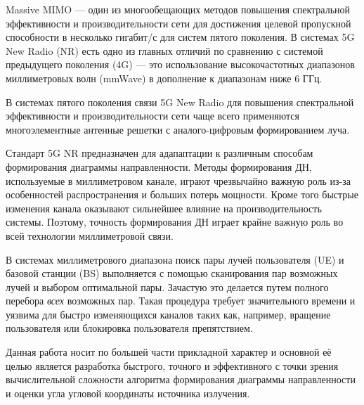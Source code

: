 \Introduction

Massive MIMO — один из многообещающих методов повышения спектральной
эффективности и производительности сети для достижения целевой пропускной
способности в несколько гигабит/с для систем пятого поколения.  В системах 5G
New Radio (NR) есть одно из главных отличий по сравнению с системой предыдущего
поколения (4G) — это использование высокочастотных диапазонов миллиметровых волн
(mmWave) в дополнение к диапазонам ниже 6 ГГц. 

В системах пятого поколения связи 5G New Radio для повышения спектральной
эффективности и производительности  сети чаще всего применяются многоэлементные 
антенные решетки с аналого-цифровым формированием луча.   

Стандарт 5G NR предназначен для адапаптации к различным способам
формирования диаграммы направленности. Методы формирования ДН,
используемые в миллиметровом канале, играют чрезвычайно
важную роль из-за особенностей распространения и больших потерь мощности.
Кроме того быстрые изменения канала оказывают сильнейшее влияние на
производительность системы.  Поэтому, точность формирования ДН
играет крайне важную роль во всей технологии миллиметровой связи. 

В системах миллиметрового диапазона поиск пары лучей пользователя (UE)
и базовой станции (BS) выполняется с помощью сканирования пар
возможных лучей и выбором оптимальной пары. Зачастую это делается путем полного
перебора \textit{всех} возможных пар.  Такая процедура требует значительного
времени и уязвима для быстро изменяющихся каналов таких как, например,
вращение пользователя или блокировка пользователя препятствием. 


Данная работа носит по большей части прикладной характер и основной её целью
является разработка  быстрого, точного и эффективного с
точки зрения вычислительной сложности алгоритма формирования диаграммы
направленности и оценки угла угловой координаты источника излучения. 




